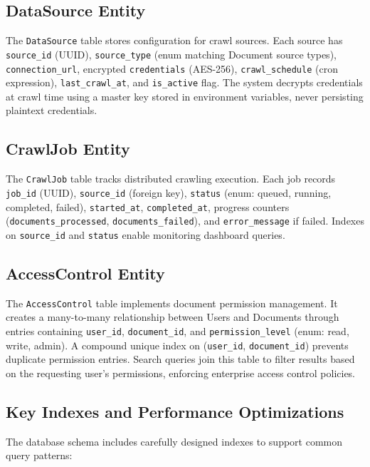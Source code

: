 \subsection{DataSource Entity}
The \texttt{DataSource} table stores configuration for crawl sources. Each source has \texttt{source\_id} (UUID), \texttt{source\_type} (enum matching Document source types), \texttt{connection\_url}, encrypted \texttt{credentials} (AES-256), \texttt{crawl\_schedule} (cron expression), \texttt{last\_crawl\_at}, and \texttt{is\_active} flag. The system decrypts credentials at crawl time using a master key stored in environment variables, never persisting plaintext credentials.

\subsection{CrawlJob Entity}
The \texttt{CrawlJob} table tracks distributed crawling execution. Each job records \texttt{job\_id} (UUID), \texttt{source\_id} (foreign key), \texttt{status} (enum: queued, running, completed, failed), \texttt{started\_at}, \texttt{completed\_at}, progress counters (\texttt{documents\_processed}, \texttt{documents\_failed}), and \texttt{error\_message} if failed. Indexes on \texttt{source\_id} and \texttt{status} enable monitoring dashboard queries.

\subsection{AccessControl Entity}
The \texttt{AccessControl} table implements document permission management. It creates a many-to-many relationship between Users and Documents through entries containing \texttt{user\_id}, \texttt{document\_id}, and \texttt{permission\_level} (enum: read, write, admin). A compound unique index on (\texttt{user\_id}, \texttt{document\_id}) prevents duplicate permission entries. Search queries join this table to filter results based on the requesting user's permissions, enforcing enterprise access control policies.

\subsection{Key Indexes and Performance Optimizations}

The database schema includes carefully designed indexes to support common query patterns:

